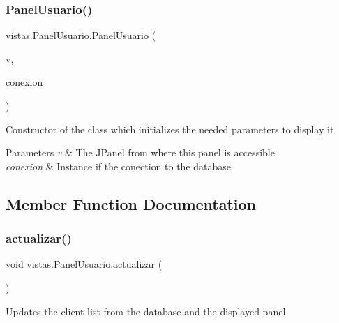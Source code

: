 \subsubsection{\texorpdfstring{Panel\+Usuario()}{PanelUsuario()}}
{\footnotesize\ttfamily vistas.\+Panel\+Usuario.\+Panel\+Usuario (\begin{DoxyParamCaption}\item[{J\+Frame}]{v,  }\item[{\mbox{\hyperlink{classconexion_s_q_l_1_1_my_data_access}{My\+Data\+Access}}}]{conexion }\end{DoxyParamCaption})\hspace{0.3cm}{\ttfamily [inline]}}

Constructor of the class which initializes the needed parameters to display it 
\begin{DoxyParams}{Parameters}
{\em v} & The J\+Panel from where this panel is accessible \\
\hline
{\em conexion} & Instance if the conection to the database \\
\hline
\end{DoxyParams}


\subsection{Member Function Documentation}
\mbox{\label{classvistas_1_1_panel_usuario_aa9aeb86ba4863b50f1c32ff55ce38932}} 
\subsubsection{\texorpdfstring{actualizar()}{actualizar()}}
{\footnotesize\ttfamily void vistas.\+Panel\+Usuario.\+actualizar (\begin{DoxyParamCaption}{ }\end{DoxyParamCaption})\hspace{0.3cm}{\ttfamily [inline]}}

Updates the client list from the database and the displayed panel \mbox{\label{classvistas_1_1_panel_usuario_a5cea3757537523a738660ae7bbb41030}} 
